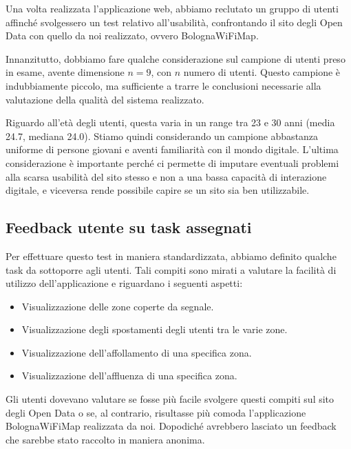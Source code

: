 
Una volta realizzata l'applicazione web, abbiamo reclutato un gruppo di utenti affinché svolgessero un test relativo all'usabilità, confrontando il sito degli Open Data con quello da noi realizzato, ovvero BolognaWiFiMap.

Innanzitutto, dobbiamo fare qualche considerazione sul campione di utenti preso in esame, avente dimensione \( n = 9 \), con \( n \) numero di utenti. Questo campione è indubbiamente piccolo, ma sufficiente a trarre le conclusioni necessarie alla valutazione della qualità del sistema realizzato.

Riguardo all'età degli utenti, questa varia in un range tra 23 e 30 anni (media 24.7, mediana 24.0). Stiamo quindi considerando un campione abbastanza uniforme di persone giovani e aventi familiarità con il mondo digitale. L'ultima considerazione è importante perché ci permette di imputare eventuali problemi alla scarsa usabilità del sito stesso e non a una bassa capacità di interazione digitale, e viceversa rende possibile capire se un sito sia ben utilizzabile.

\subsection{Feedback utente su task assegnati}
Per effettuare questo test in maniera standardizzata, abbiamo definito qualche task da sottoporre agli utenti. Tali compiti sono mirati a valutare la facilità di utilizzo dell'applicazione e riguardano i seguenti aspetti:
\begin{itemize}
    \item Visualizzazione delle zone coperte da segnale.
    \item Visualizzazione degli spostamenti degli utenti tra le varie zone.
    \item Visualizzazione dell'affollamento di una specifica zona.
    \item Visualizzazione dell'affluenza di una specifica zona.
\end{itemize}

Gli utenti dovevano valutare se fosse più facile svolgere questi compiti sul sito degli Open Data o se, al contrario, risultasse più comoda l'applicazione BolognaWiFiMap realizzata da noi. Dopodiché avrebbero lasciato un feedback che sarebbe stato raccolto in maniera anonima.


